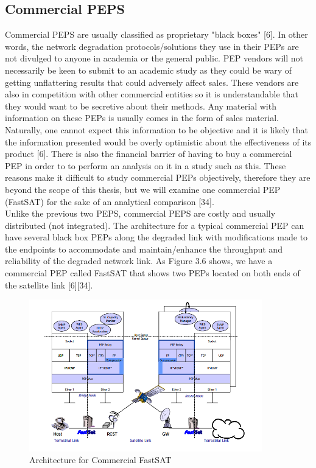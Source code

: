\documentclass{uathesis}
\begin{document}
\subsection{Commercial PEPS} 
Commercial PEPS are usually classified as proprietary "black boxes" [6]. In other words, the network degradation protocols/solutions they use in their PEPs are not divulged to anyone in academia or the general public. PEP vendors will not necessarily be keen to submit to an academic study as they could be wary of getting unflattering results that could adversely affect sales. These vendors are also in competition with other commercial entities so it is understandable that they would want to be secretive about their methods. Any material with information on these PEPs is usually comes in the form of sales material. Naturally, one cannot expect this information to be objective and it is likely that the information presented would be overly optimistic about the effectiveness of its product [6]. There is also the financial barrier of having to buy a commercial PEP in order to to perform an analysis on it in a study such as this. These reasons make it difficult to study commercial PEPs objectively, therefore they are beyond the scope of this thesis, but we will examine one commercial PEP (FastSAT) for the sake of an analytical comparison [34].\\

Unlike the previous two PEPS, commercial PEPS are costly and usually distributed (not integrated). The architecture for a typical commercial PEP can have several black box PEPs along the degraded link with modifications made to the endpoints to accommodate and maintain/enhance the throughput and reliability of the degraded network link. As Figure 3.6 shows, we have a commercial PEP called FastSAT that shows two PEPs located on both ends of the satellite link [6][34]. \\

\begin{figure}[ht!]
    \centering
    \includegraphics[width=0.9\textwidth]{FastSat.PNG}
    \caption{Architecture for Commercial FastSAT}
    \label{fig:FastSat}
\end{figure}
\end{document}
